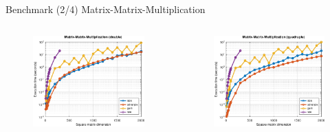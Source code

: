 \begin{frame}{Benchmark (2/4) Matrix-Matrix-Multiplication}

\begin{columns}
\begin{column}{0.3\textwidth}
\begin{figure}
\centering
\includegraphics[width=1.0\linewidth]{res/data/2021-11-24_run-01-mmm-double-semilogy}
\end{figure}
\end{column}
\begin{column}{0.3\textwidth}
\begin{figure}
\centering
\includegraphics[width=1.0\linewidth]{res/data/2021-11-24_run-01-mmm-quadruple-semilogy}

\end{figure}
\end{column}
\end{columns}
\end{frame}
